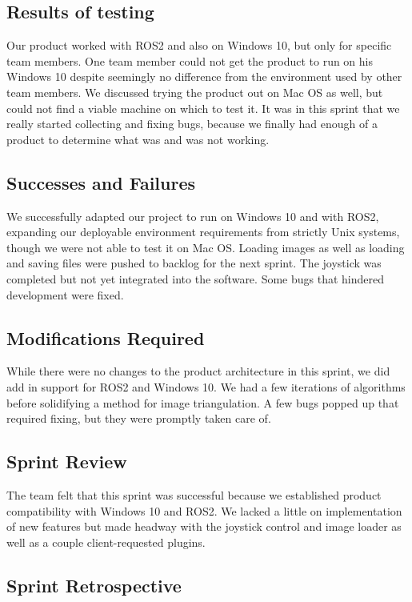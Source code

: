 \subsection{Results of testing}

Our product worked with ROS2 and also on Windows 10, but only for specific team members. One team member could not get the product to run on his Windows 10 despite seemingly no difference from the environment used by other team members. We discussed trying the product out on Mac OS as well, but could not find a viable machine on which to test it. It was in this sprint that we really started collecting and fixing bugs, because we finally had enough of a product to determine what was and was not working. 

\subsection{Successes and Failures}

We successfully adapted our project to run on Windows 10 and with ROS2, expanding our deployable environment requirements from strictly Unix systems, though we were not able to test it on Mac OS. Loading images as well as loading and saving files were pushed to backlog for the next sprint. The joystick was completed but not yet integrated into the software. Some bugs that hindered development were fixed.

\subsection{Modifications Required}

While there were no changes to the product architecture in this sprint, we did add in support for ROS2 and Windows 10. We had a few iterations of algorithms before solidifying a method for image triangulation. A few bugs popped up that required fixing, but they were promptly taken care of.

\subsection{Sprint Review}

The team felt that this sprint was successful because we established product compatibility with Windows 10 and ROS2. We lacked a little on implementation of new features but made headway with the joystick control and image loader as well as a couple client-requested plugins.

\subsection{Sprint Retrospective}

